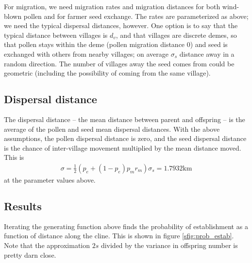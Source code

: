 For migration, we need migration rates and migration distances for both wind-blown pollen
and for farmer seed exchange.
The rates are parameterized as above;
we need the typical dispersal distances, however.
One option is to say that the typical distance between villages is $d_v$,
and that villages are discrete demes,
so that pollen stays within the deme (pollen migration distance 0)
and seed is exchanged with others from nearby villages;
on average $\sigma_s$ distance away in a random direction.
The number of villages away the seed comes from could be geometric 
(including the possibility of coming from the same village).

\subsection{Dispersal distance}

The dispersal distance
-- the mean distance between parent and offspring --
is the average of the pollen and seed mean dispersal distances.
With the above assumptions, the pollen dispersal distance is zero,
and the seed dispersal distance is the chance of inter-village movement
multiplied by the mean distance moved.
This is
\begin{align}
  \sigma = \frac{1}{2} (p_e + (1-p_e) p_m r_m ) \sigma_s = 1.7932 \text{km}
\end{align}
at the parameter values above.

\subsection{Results}

Iterating the generating function above finds the probability of establishment as a function of distance along the cline.
This is shown in figure \ref{sfig:prob_estab}.
Note that the approximation $2s$ divided by the variance in offspring number is pretty darn close.

